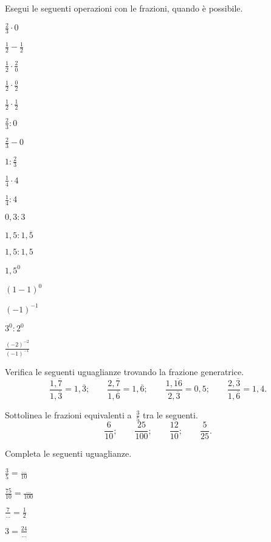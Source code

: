 \begin{esercizio}
Esegui le seguenti operazioni con le frazioni, quando è possibile.
\begin{multicols}{4}
\begin{enumeratea}
\spazielenx
\item $\displaystyle{\frac{2}{3}\cdot0}$
\item $\displaystyle{\frac{1}{2}-\frac{1}{2}}$
\item $\displaystyle{\frac{1}{2}\cdot\frac{2}{0}}$
\item $\displaystyle{\frac{1}{2}}\cdot\frac{0}{2}$
\item $\displaystyle{\frac{1}{2}\cdot\frac{1}{2}}$
\item $\displaystyle{\frac{2}{3}:0}$
\item $\displaystyle{\frac{2}{3}-0}$
\item $\displaystyle{1:\frac{2}{3}}$
\item $\displaystyle{\frac{1}{4}\cdot4}$
\item $\displaystyle{\frac{1}{4}:4}$
\item $0,3:3$
\item $\displaystyle{1,5:1,\overline{5}}$
\item $1,5:1,5$
\item $1,5^0$
\item $(1-1)^0$
\item $(-1)^{-1}$
\item $3^0:2^0$
\item $\frac{(-2)^{-2}}{(-1)^{-1}}$
\end{enumeratea}
\end{multicols}
\end{esercizio}

\begin{esercizio}
Verifica le seguenti uguaglianze trovando la frazione generatrice.
\[\frac{1,\overline{7}}{1,\overline{3}}=1,\overline{3};\qquad%
\frac{2,\overline{7}}{1,\overline{6}}=1,\overline{6};\qquad%
\frac{1,\overline{16}}{2,\overline{3}}=0,5;\qquad%
\frac{2,\overline{3}}{1,\overline{6}}=1,4.\]
\end{esercizio}


\begin{esercizio}
Sottolinea le frazioni equivalenti a~$\frac{3}{5}$ tra le seguenti.
\[\frac{6}{10};\qquad\frac{25}{100};\qquad\frac{12}{10};\qquad\frac{5}{25}.\]
\end{esercizio}


\begin{esercizio}
Completa le seguenti uguaglianze.
\begin{multicols}{4}
\begin{enumeratea}
\item $\displaystyle{\frac{3}{5}=\frac{\ldots}{10}}$
\item $\displaystyle{\frac{75}{10}=\frac{\ldots}{100}}$
\item $\displaystyle{\frac{7}{\ldots}=\frac{1}{2}}$
\item $\displaystyle{3=\frac{24}{\ldots}}$
\end{enumeratea}
\end{multicols}
\end{esercizio}


